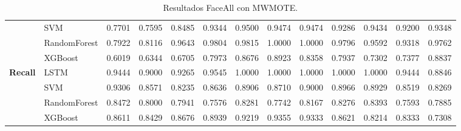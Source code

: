 \begin{table}[h]
\begin{adjustbox}{max width=15cm}
\begin{tabular}{|c|l|r|r|r|r|r|r|r|r|r|r|r|}
			& SVM &  0.7701 &  0.7595 &  0.8485 &  0.9344 &  0.9500 &  0.9474 &  0.9474 &  0.9286 &  0.9434 &  0.9200 &  0.9348 \\
			& RandomForest &  0.7922 &  0.8116 &  0.9643 &  0.9804 &  0.9815 &  1.0000 &  1.0000 &  0.9796 &  0.9592 &  0.9318 &  0.9762 \\
			& XGBoost &  0.6019 &  0.6344 &  0.6705 &  0.7973 &  0.8676 &  0.8923 &  0.8358 &  0.7937 &  0.7302 &  0.7377 &  0.8837 \\
			\hline
			\textbf{Recall} & LSTM &  0.9444 &  0.9000 &  0.9265 &  0.9545 &  1.0000 &  1.0000 &  1.0000 &  1.0000 &  1.0000 &  0.9444 &  0.8846 \\
			& SVM &  0.9306 &  0.8571 &  0.8235 &  0.8636 &  0.8906 &  0.8710 &  0.9000 &  0.8966 &  0.8929 &  0.8519 &  0.8269 \\
			& RandomForest &  0.8472 &  0.8000 &  0.7941 &  0.7576 &  0.8281 &  0.7742 &  0.8167 &  0.8276 &  0.8393 &  0.7593 &  0.7885 \\
			& XGBoost &  0.8611 &  0.8429 &  0.8676 &  0.8939 &  0.9219 &  0.9355 &  0.9333 &  0.8621 &  0.8214 &  0.8333 &  0.7308 \\
			\hline
		\end{tabular}
	\end{adjustbox}
	\label{tab:faceAllMWMOTE}
	\caption{Resultados FaceAll con MWMOTE.}
\end{table}
